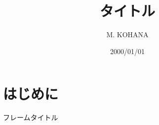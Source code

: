 \documentclass[dvipdfmx]{beamer}
\title{タイトル}
\author{M. KOHANA}
\institute[Seikei University]{Seikei University\\Department of Computer and Information Science}
\date{2000/01/01}
\begin{document}
\frame{\titlepage}

\section{はじめに}
\begin{frame}{フレームタイトル}

\end{frame}
\end{document}
